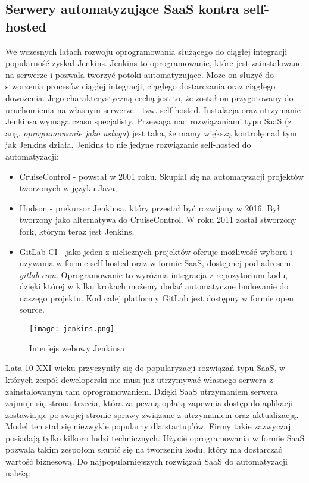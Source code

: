 \subsection{Serwery automatyzujące SaaS kontra self-hosted}
We wczesnych latach rozwoju oprogramowania służącego do ciągłej integracji popularność zyskał Jenkins. Jenkins to oprogramowanie, które jest zainstalowane na serwerze i pozwala tworzyć potoki automatyzujące. Może on służyć do stworzenia procesów ciągłej integracji, ciągłego dostarczania oraz ciągłego dowożenia. Jego charakterystyczną cechą jest to, że został on przygotowany do uruchomienia na własnym serwerze - tzw. self-hosted. Instalacja oraz utrzymanie Jenkinsa wymaga czasu specjalisty. Przewaga nad rozwiązaniami typu SaaS (z ang. \textit{oprogramowanie jako usługa}) jest taka, że mamy większą kontrolę nad tym jak Jenkins działa.
Jenkins to nie jedyne rozwiązanie self-hosted do automatyzacji:
\begin{itemize}
    \item CruiseControl - powstał w 2001 roku. Skupiał się na automatyzacji projektów tworzonych w języku Java,
    \item Hudson - prekursor Jenkinsa, który przestał być rozwijany w 2016. Był tworzony jako alternatywa do CruiseControl. W roku 2011 został stworzony fork, którym teraz jest Jenkins,
    \item GitLab CI - jako jeden z nielicznych projektów oferuje możliwość wyboru i używania w formie self-hosted oraz w formie SaaS, dostępnej pod adresem \textit{gitlab.com}. Oprogramowanie to wyróżnia integracja z repozytorium kodu, dzięki której w kilku krokach możemy dodać automatyczne budowanie do naszego projektu. Kod całej platformy GitLab jest dostępny w formie open source.
\end{itemize}
\begin{figure}[htbp]
    \centering
    \texttt{[image: jenkins.png]}
    \caption{Interfejs webowy Jenkinsa}
    \label{fig:jenkins}
\end{figure}
\par
Lata 10 XXI wieku przyczyniły się do popularyzacji rozwiązań typu SaaS, w których zespół deweloperski nie musi już utrzymywać własnego serwera z zainstalowanym tam oprogramowaniem. Dzięki SaaS utrzymaniem serwera zajmuje się strona trzecia, która za pewną opłatą zapewnia dostęp do aplikacji - zostawiając po swojej stronie sprawy związane z utrzymaniem oraz aktualizacją. Model ten stał się niezwykle popularny dla startup'ów. Firmy takie zazwyczaj posiadają tylko kilkoro ludzi technicznych. Użycie oprogramowania w formie SaaS pozwala takim zespołom skupić się na tworzeniu kodu, który ma dostarczać wartość biznesową. Do najpopularniejszych rozwiązań SaaS do automatyzacji należą:
